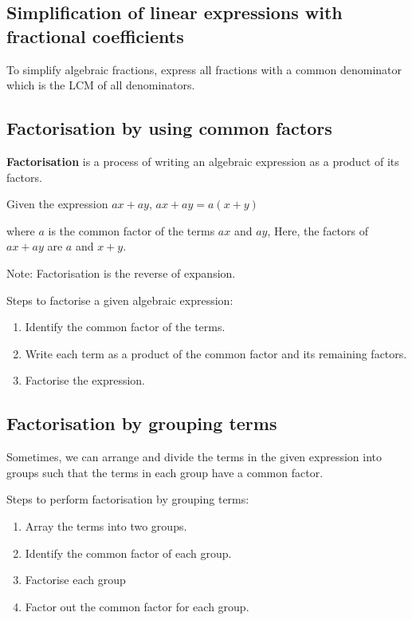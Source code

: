 \documentclass[../main]{subfiles}
\begin{document}
\subsection{Simplification of linear expressions with fractional coefficients}

To simplify algebraic fractions, express all fractions with a common denominator
which is the LCM of all denominators. 

\subsection{Factorisation by using common factors}
\textbf{Factorisation} is a process of writing an algebraic expression as a
product of its factors.

Given the expression \(ax+ay\),
\(ax + ay = a(x + y)\)

where \(a\) is the common factor of the terms \(ax\) and \(ay\), Here, the
factors of \(ax + ay\) are \(a\) and \(x + y\).

Note: Factorisation is the reverse of expansion.

Steps to factorise a given algebraic expression:
\begin{enumerate}
\item  Identify the common factor of the terms.
 
\item  Write each term as a product of the common factor and its remaining
  factors.
 
\item  Factorise the expression.
  
\end{enumerate}

\subsection{Factorisation by grouping terms}

Sometimes, we can arrange and divide the terms in the given expression into
groups such that the terms in each group have a common factor.

Steps to perform factorisation by grouping terms:
\begin{enumerate}
\item Array the terms into two groups.
 
\item  Identify the common factor of each group.
\item  Factorise each group
\item Factor out the common factor for each group.
  
\end{enumerate}
\end{document}
